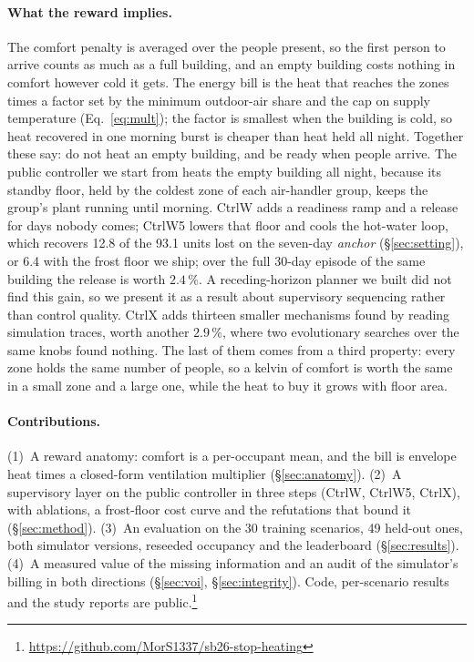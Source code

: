 \documentclass{article}
\begin{document}
\paragraph{What the reward implies.} The comfort penalty is averaged over the people present,
so the first person to arrive counts as much as a full building, and an empty building costs
nothing in comfort however cold it gets. The energy bill is the heat that reaches the zones
times a factor set by the minimum outdoor-air share and the cap on supply temperature
(Eq.~\ref{eq:mult}); the factor is smallest when the building is cold, so heat recovered in one
morning burst is cheaper than heat held all night. Together these say: do not heat an empty
building, and be ready when people arrive. The public controller we start from heats the empty
building all night, because its standby floor, held by the coldest zone of each air-handler
group, keeps the group's plant running until morning. CtrlW adds a readiness ramp and a release
for days nobody comes; CtrlW5 lowers that floor and cools the hot-water loop, which recovers
12.8 of the 93.1 units lost on the seven-day \emph{anchor} (\S\ref{sec:setting}), or 6.4 with
the frost floor we ship; over the full 30-day episode of the same building the release is worth
$2.4\,\%$. A receding-horizon planner we built did not find this gain, so we
present it as a result about supervisory sequencing rather than control quality. CtrlX adds
thirteen smaller mechanisms found by reading simulation traces, worth another $2.9\,\%$, where
two evolutionary searches over the same knobs found nothing. The last of them comes from a third
property: every zone holds the same number of people, so a kelvin of comfort is worth the same
in a small zone and a large one, while the heat to buy it grows with floor area.

\paragraph{Contributions.} (1)~A reward anatomy: comfort is a per-occupant mean, and the bill
is envelope heat times a closed-form ventilation multiplier (\S\ref{sec:anatomy}). (2)~A
supervisory layer on the public controller in three steps (CtrlW, CtrlW5, CtrlX), with
ablations, a frost-floor cost curve and the refutations that bound it (\S\ref{sec:method}).
(3)~An evaluation on the 30 training scenarios, 49 held-out ones, both simulator versions,
reseeded occupancy and the leaderboard (\S\ref{sec:results}). (4)~A measured value of the
missing information and an audit of the simulator's billing in both directions
(\S\ref{sec:voi}, \S\ref{sec:integrity}). Code, per-scenario results and the study reports are
public.\footnote{\url{https://github.com/MorS1337/sb26-stop-heating}}
\end{document}
